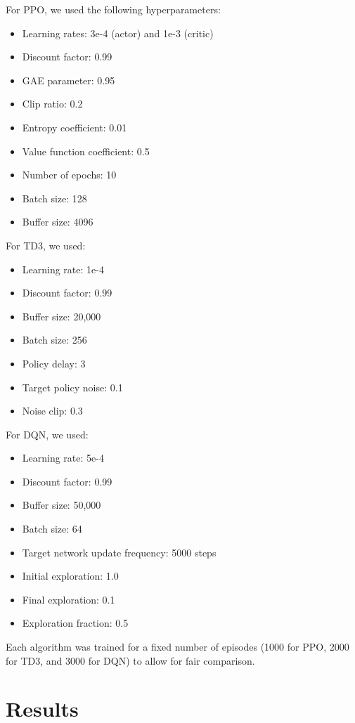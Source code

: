 \documentclass[12pt]{article}
\begin{document}
For PPO, we used the following hyperparameters:
\begin{itemize}
    \item Learning rates: 3e-4 (actor) and 1e-3 (critic)
    \item Discount factor: 0.99
    \item GAE parameter: 0.95
    \item Clip ratio: 0.2
    \item Entropy coefficient: 0.01
    \item Value function coefficient: 0.5
    \item Number of epochs: 10
    \item Batch size: 128
    \item Buffer size: 4096
\end{itemize}

For TD3, we used:
\begin{itemize}
    \item Learning rate: 1e-4
    \item Discount factor: 0.99
    \item Buffer size: 20,000
    \item Batch size: 256
    \item Policy delay: 3
    \item Target policy noise: 0.1
    \item Noise clip: 0.3
\end{itemize}

For DQN, we used:
\begin{itemize}
    \item Learning rate: 5e-4
    \item Discount factor: 0.99
    \item Buffer size: 50,000
    \item Batch size: 64
    \item Target network update frequency: 5000 steps
    \item Initial exploration: 1.0
    \item Final exploration: 0.1
    \item Exploration fraction: 0.5
\end{itemize}

Each algorithm was trained for a fixed number of episodes (1000 for PPO, 2000 for TD3, and 3000 for DQN) to allow for fair comparison.

\section{Results}
\end{document}

